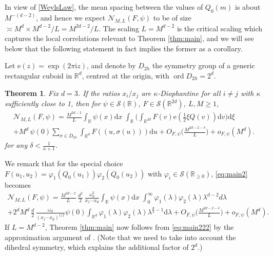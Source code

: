 \documentclass[12pt]{amsart}
\newtheorem{thm}{Theorem}[section]
\theoremstyle{definition}
\theoremstyle{remark}
\numberwithin{equation}{section}
\newcommand{\dd}{\mathrm{d}}
\newcommand{\R}{\mathbb{R}}
\newcommand{\e}{\mathrm{e}}
\newcommand{\cN}{\mathcal{N}}
\newcommand{\cS}{\mathcal{S}}
\newcommand{\ord}{\operatorname{ord}}
\begin{document}
In view of \eqref{WeylsLaw}, the mean spacing between the values of $Q_0(m)$ is about $M^{-(d-2)}$, and hence we expect $\cN_{M,L}(F,\psi)$ to be of size $\asymp M^d\times M^{d-2}/L=M^{2d-2}/L$. The scaling $L=M^{d-2}$ is the critical scaling which captures the local correlations relevant to Theorem \ref{thm:main}, and we will see below that the following statement in fact implies the former as a corollary. 

Let $\e(z)=\exp(2\pi\mathrm{i} z)$, and denote by $D_{2h}$ the symmetry group of a generic rectangular cuboid in $\R^d$, centred at the origin, with $\ord D_{2h}=2^d$. 

\begin{thm}
  \label{thm:main2}
  Fix $d=3$.
  If the ratios $x_i/x_j$ are $\kappa$-Diophantine for all $i \neq j$ with $\kappa$ sufficiently close to 1, then for $\psi\in\cS(\R)$, $F\in\cS(\R^{2d})$, $L,M\geq 1$,
\begin{multline}\label{eq:main2}
\cN_{M,L}(F,\psi)   
= \frac{M^{2d-2}}{L}  \int_{\R} \psi(x) \dd x \;\int_{\R} \bigg( \int_{\R^{2d}} F(v) \e( \tfrac{1}{2} \xi Q(v)) \dd v \bigg) \dd \xi \\
+ M^d \, \psi(0) \sum_{\sigma\in D_{2h}} \int_{\R^d} F((u,\sigma(u))) \dd u  + O_{F,\psi}\bigg(\frac{M^{2d-2-\delta}}{L}\bigg)+o_{F,\psi}(M^d).
\end{multline}
for any $\delta < \tfrac{1}{\kappa + 1}$. 
\end{thm}

We remark that for the special choice $F(u_1,u_2)=\varphi_1(Q_0(u_1)) \varphi_2(Q_0(u_2))$ with $\varphi_i\in\cS(\R_{\geq 0})$, \eqref{eq:main2} becomes
\begin{multline}\label{eq:main222}
\cN_{M,L}(F,\psi)   
= \frac{M^{2d-2}}{L} \, \frac{d^2}{2}\, \frac{\omega_d^2}{x_1\cdots x_d} \int_{\R} \psi(x) \dd x \; \int_0^\infty \varphi_1(\lambda) \varphi_2(\lambda) \lambda^{d-2} d\lambda  \\
+ 2^dM^d \,\frac{d}{2}\, \frac{\omega_d}{(x_1\cdots x_d)^{1/2}}  \psi(0) \int_{\R^d} \varphi_1(\lambda)\varphi_2(\lambda) \lambda^{\frac{d}{2}-1} \dd \lambda  + O_{F,\psi}\bigg(\frac{M^{2d-2-\delta}}{L}\bigg)+o_{F,\psi}(M^d).
\end{multline}
If $L=M^{d-2}$, Theorem \ref{thm:main} now follows from \eqref{eq:main222} by the approximation argument of \cite[Section 2]{Marklof2002}. (Note that we need to take into account the dihedral symmetry, which explains the additional factor of $2^d$.)
\end{document}
